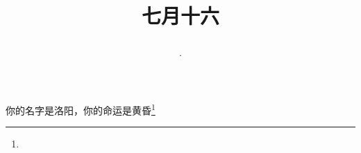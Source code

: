 \title{\date[d=19,m=8,y=2024][year:cn-y,年,month:cn,day:cn,日,·,weekday]·七月十六 }
你的名字是洛阳，你的命运是黄昏\footnote{ }

